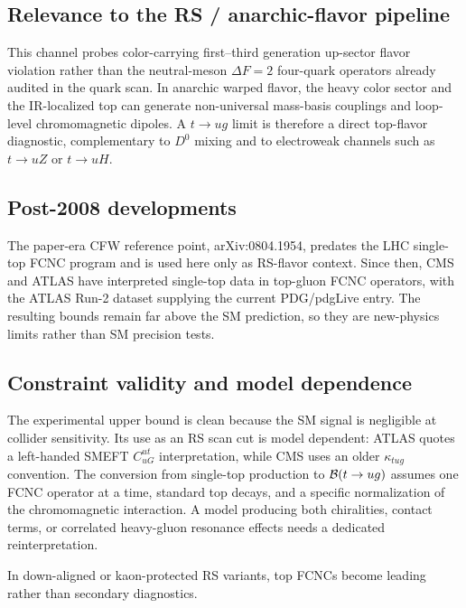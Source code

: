 \subsection*{Relevance to the RS / anarchic-flavor pipeline}
This channel probes color-carrying first--third generation up-sector flavor
violation rather than the neutral-meson \(\Delta F=2\) four-quark operators
already audited in the quark scan.  In anarchic warped flavor, the heavy color
sector and the IR-localized top can generate non-universal mass-basis couplings
and loop-level chromomagnetic dipoles.  A \(t\to u g\) limit is therefore a
direct top-flavor diagnostic, complementary to \(D^0\) mixing and to
electroweak channels such as \(t\to uZ\) or \(t\to uH\).

\subsection*{Post-2008 developments}
The paper-era CFW reference point, arXiv:0804.1954, predates the LHC
single-top FCNC program and is used here only as RS-flavor context.  Since
then, CMS and ATLAS have interpreted single-top data in top-gluon FCNC
operators, with the ATLAS Run-2 dataset supplying the current PDG/pdgLive
entry.  The resulting bounds remain far above the SM prediction, so they are
new-physics limits rather than SM precision tests.

\subsection*{Constraint validity and model dependence}
The experimental upper bound is clean because the SM signal is negligible at
collider sensitivity.  Its use as an RS scan cut is model dependent: ATLAS
quotes a left-handed SMEFT \(C_{uG}^{ut}\) interpretation, while CMS uses an
older \(\kappa_{tug}\) convention.  The conversion from single-top production
to \({\cal B}(t\to u g)\) assumes one FCNC operator at a time, standard top
decays, and a specific normalization of the chromomagnetic interaction.  A
model producing both chiralities, contact terms, or correlated heavy-gluon
resonance effects needs a dedicated reinterpretation.

In down-aligned or kaon-protected RS variants, top FCNCs become leading rather
than secondary diagnostics.

